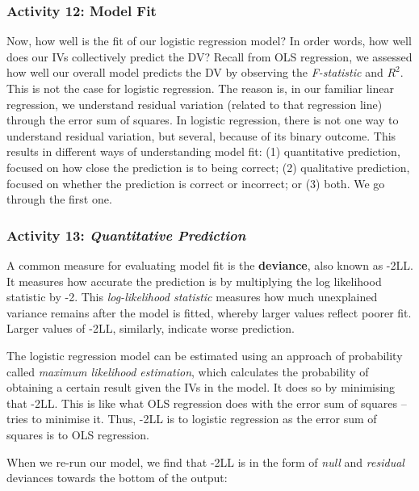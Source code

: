 \documentclass[
]{book}
\begin{document}
\hypertarget{activity-12-model-fit}{%
\subsubsection{\texorpdfstring{Activity 12: \textbf{Model Fit}}{Activity 12: Model Fit}}\label{activity-12-model-fit}}

Now, how well is the fit of our logistic regression model? In order words, how well does our IVs collectively predict the DV? Recall from OLS regression, we assessed how well our overall model predicts the DV by observing the \emph{F-statistic} and \emph{\(R^2\)}. This is not the case for logistic regression. The reason is, in our familiar linear regression, we understand residual variation (related to that regression line) through the error sum of squares. In logistic regression, there is not one way to understand residual variation, but several, because of its binary outcome. This results in different ways of understanding model fit: (1) quantitative prediction, focused on how close the prediction is to being correct; (2) qualitative prediction, focused on whether the prediction is correct or incorrect; or (3) both. We go through the first one.

\hypertarget{activity-13-quantitative-prediction}{%
\subsubsection{\texorpdfstring{Activity 13: \emph{Quantitative Prediction}}{Activity 13: Quantitative Prediction}}\label{activity-13-quantitative-prediction}}

A common measure for evaluating model fit is the \textbf{deviance}, also known as -2LL. It measures how accurate the prediction is by multiplying the log likelihood statistic by -2. This \emph{log-likelihood statistic} measures how much unexplained variance remains after the model is fitted, whereby larger values reflect poorer fit. Larger values of -2LL, similarly, indicate worse prediction.

The logistic regression model can be estimated using an approach of probability called \emph{maximum likelihood estimation}, which calculates the probability of obtaining a certain result given the IVs in the model. It does so by minimising that -2LL. This is like what OLS regression does with the error sum of squares -- tries to minimise it. Thus, -2LL is to logistic regression as the error sum of squares is to OLS regression.

When we re-run our model, we find that -2LL is in the form of \emph{null} and \emph{residual} deviances towards the bottom of the output:
\end{document}
